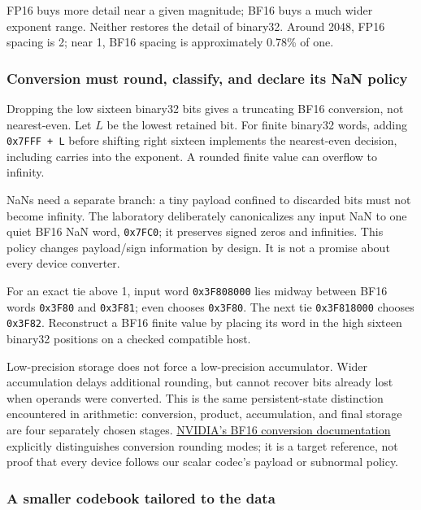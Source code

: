 FP16 buys more detail near a given magnitude; BF16 buys a much wider exponent range. Neither restores the detail of binary32. Around 2048, FP16 spacing is 2; near 1, BF16 spacing is approximately 0.78\% of one.

\subsubsection{Conversion must round, classify, and declare its NaN policy}\label{01-foundations-i-ch001-conversion-must-round-classify-and-declare-its-nan-policy}

\hypertarget{01-foundations-i-ch001-conversion-must-round-classify-and-declare-its-nan-policy}{}

Dropping the low sixteen binary32 bits gives a truncating BF16 conversion, not nearest-even. Let \(L\) be the lowest retained bit. For finite binary32 words, adding \texttt{0x7FFF\ +\ L} before shifting right sixteen implements the nearest-even decision, including carries into the exponent. A rounded finite value can overflow to infinity.

NaNs need a separate branch: a tiny payload confined to discarded bits must not become infinity. The laboratory deliberately canonicalizes any input NaN to one quiet BF16 NaN word, \texttt{0x7FC0}; it preserves signed zeros and infinities. This policy changes payload/sign information by design. It is not a promise about every device converter.

For an exact tie above 1, input word \texttt{0x3F808000} lies midway between BF16 words \texttt{0x3F80} and \texttt{0x3F81}; even chooses \texttt{0x3F80}. The next tie \texttt{0x3F818000} chooses \texttt{0x3F82}. Reconstruct a BF16 finite value by placing its word in the high sixteen binary32 positions on a checked compatible host.

Low-precision storage does not force a low-precision accumulator. Wider accumulation delays additional rounding, but cannot recover bits already lost when operands were converted. This is the same persistent-state distinction encountered in arithmetic: conversion, product, accumulation, and final storage are four separately chosen stages. \href{https://docs.nvidia.com/cuda/cuda-math-api/cuda_math_api/group__CUDA__MATH____BFLOAT16__MISC.html}{NVIDIA's BF16 conversion documentation} explicitly distinguishes conversion rounding modes; it is a target reference, not proof that every device follows our scalar codec's payload or subnormal policy.

\subsubsection{A smaller codebook tailored to the data}\label{01-foundations-i-ch001-a-smaller-codebook-tailored-to-the-data}

